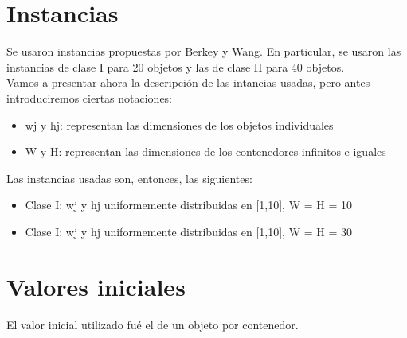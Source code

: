 \documentclass[a4paper,10pt]{article}
\begin{document}
\section{Instancias}
Se usaron instancias propuestas por Berkey y Wang. En particular, se usaron
las instancias de clase I para 20 objetos y las de clase II para 40 objetos.\\
Vamos a presentar ahora la descripción de las intancias usadas, pero antes introduciremos
ciertas notaciones:\\
\begin{itemize}
 \item wj y hj: representan las dimensiones de los objetos individuales
 \item W y H: representan las dimensiones de los contenedores infinitos e iguales
\end{itemize}
Las instancias usadas son, entonces, las siguientes:
\begin{itemize}
 \item Clase I: wj y hj uniformemente distribuidas en [1,10], W = H = 10
 \item Clase I: wj y hj uniformemente distribuidas en [1,10], W = H = 30
\end{itemize}

\section{Valores iniciales}
El valor inicial utilizado fué el de un objeto por contenedor.
\end{document}
